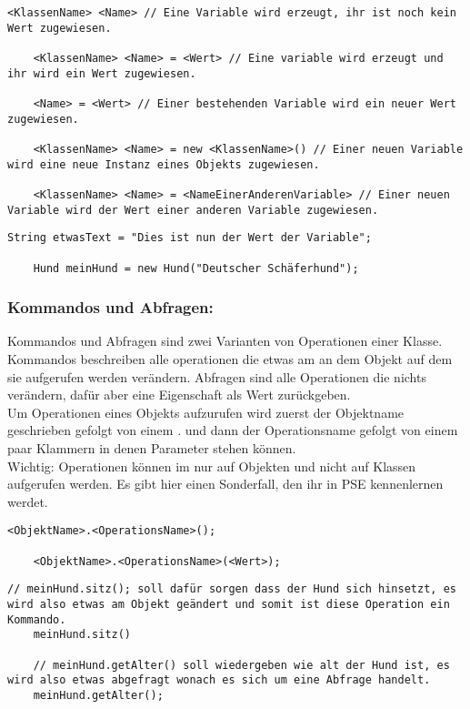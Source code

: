 \begin{lstlisting}[title=\textbf{Variablen Syntax}]
	<KlassenName> <Name> // Eine Variable wird erzeugt, ihr ist noch kein Wert zugewiesen.

	<KlassenName> <Name> = <Wert> // Eine variable wird erzeugt und ihr wird ein Wert zugewiesen.
	
	<Name> = <Wert> // Einer bestehenden Variable wird ein neuer Wert zugewiesen.
	
	<KlassenName> <Name> = new <KlassenName>() // Einer neuen Variable wird eine neue Instanz eines Objekts zugewiesen.
	
	<KlassenName> <Name> = <NameEinerAnderenVariable> // Einer neuen Variable wird der Wert einer anderen Variable zugewiesen. 
\end{lstlisting}
\begin{lstlisting}[title=\textbf{Variable Beispiel}]
 	String etwasText = "Dies ist nun der Wert der Variable";
 	
 	Hund meinHund = new Hund("Deutscher Schäferhund");
\end{lstlisting}

\subsubsection*{Kommandos und Abfragen:}
Kommandos und Abfragen sind zwei Varianten von Operationen einer Klasse. Kommandos beschreiben alle operationen die etwas am an dem Objekt auf dem sie aufgerufen werden verändern.
Abfragen sind alle Operationen die nichts verändern, dafür aber eine Eigenschaft als Wert zurückgeben.\\
Um Operationen eines Objekts aufzurufen wird zuerst der Objektname geschrieben gefolgt von einem . und dann der Operationsname gefolgt von einem paar Klammern in denen Parameter stehen können.\\
{\color{red} Wichtig: } Operationen können im nur auf Objekten und nicht auf Klassen aufgerufen werden.
Es  gibt hier einen Sonderfall, den ihr in PSE kennenlernen werdet.

\begin{lstlisting}[title=\textbf{Kommando/Abfrage Syntax}]
	<ObjektName>.<OperationsName>();
	
	<ObjektName>.<OperationsName>(<Wert>);
\end{lstlisting}

\begin{lstlisting}[title=\textbf{Kommando/Abfrage Beispiel}]
    // meinHund.sitz(); soll dafür sorgen dass der Hund sich hinsetzt, es wird also etwas am Objekt geändert und somit ist diese Operation ein Kommando.
  	meinHund.sitz()

	// meinHund.getAlter() soll wiedergeben wie alt der Hund ist, es wird also etwas abgefragt wonach es sich um eine Abfrage handelt.
	meinHund.getAlter();
\end{lstlisting}
